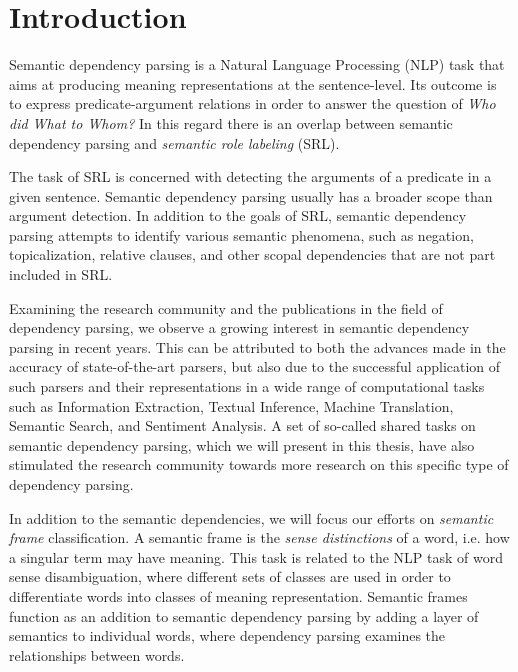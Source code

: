 \chapter{Introduction}
\label{chap:introduction}


Semantic dependency parsing is a Natural Language Processing (NLP) task that aims at producing meaning representations at the sentence-level. Its outcome is to express predicate-argument relations in order to answer the question of \textit{Who did What to Whom?} In this regard there is an overlap between semantic dependency parsing and \textit{semantic role labeling} (SRL). 

The task of SRL is concerned with detecting the arguments of a predicate in a given sentence. Semantic dependency parsing usually has a broader scope than argument detection. In addition to the goals of SRL, semantic dependency parsing attempts to identify various semantic phenomena, such as negation, topicalization, relative clauses, and other scopal dependencies that are not part included in SRL.

Examining the research community and the publications in the field of dependency parsing, we observe a growing interest in semantic dependency parsing in recent years. This can be attributed to both the advances made in the accuracy of state-of-the-art parsers, but also due to the successful application of such parsers and their representations in a wide range of computational tasks such as Information Extraction, Textual Inference, Machine Translation, Semantic Search, and Sentiment Analysis. A set of so-called shared tasks on semantic dependency parsing, which we will present in this thesis, have also stimulated the research community towards more research on this specific type of dependency parsing.

In addition to the semantic dependencies, we will focus our efforts on \textit{semantic frame} classification. A semantic frame is the \textit{sense distinctions} of a word, i.e. how a singular term may have meaning. This task is related to the NLP task of word sense disambiguation, where different sets of classes are used in order to differentiate words into classes of meaning representation. Semantic frames function as an addition to semantic dependency parsing by adding a layer of semantics to individual words, where dependency parsing examines the relationships between words.

